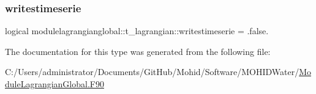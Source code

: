 \subsubsection{\texorpdfstring{writestimeserie}{writestimeserie}}
{\footnotesize\ttfamily logical modulelagrangianglobal\+::t\+\_\+lagrangian\+::writestimeserie = .false.\hspace{0.3cm}{\ttfamily [private]}}



The documentation for this type was generated from the following file\+:\begin{DoxyCompactItemize}
\item 
C\+:/\+Users/administrator/\+Documents/\+Git\+Hub/\+Mohid/\+Software/\+M\+O\+H\+I\+D\+Water/\mbox{\hyperlink{_module_lagrangian_global_8_f90}{Module\+Lagrangian\+Global.\+F90}}\end{DoxyCompactItemize}
